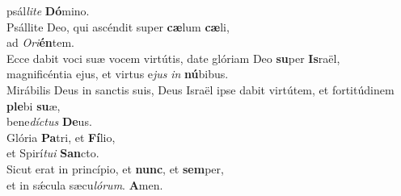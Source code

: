 \oddverse psál\textit{li}\textit{te} \textbf{Dó}mino.\\
\evenverse Psállite Deo, qui ascéndit super \textbf{cæ}lum \textbf{cæ}li,~\*\\
\evenverse ad \textit{O}\textit{ri}\textbf{én}tem.\\
\oddverse Ecce dabit voci suæ vocem virtútis, date glóriam Deo \textbf{su}per \textbf{Is}raël,~\*\\
\oddverse magnificéntia ejus, et virtus e\textit{jus} \textit{in} \textbf{nú}bibus.\\
\evenverse Mirábilis Deus in sanctis suis, Deus Israël ipse dabit virtútem, et fortitúdinem \textbf{ple}bi \textbf{su}æ,~\*\\
\evenverse bene\textit{dí}\textit{ctus} \textbf{De}us.\\
\oddverse Glória \textbf{Pa}tri, et \textbf{Fí}lio,~\*\\
\oddverse et Spirí\textit{tu}\textit{i} \textbf{San}cto.\\
\evenverse Sicut erat in princípio, et \textbf{nunc}, et \textbf{sem}per,~\*\\
\evenverse et in sǽcula sæcu\textit{ló}\textit{rum}. \textbf{A}men.\\
